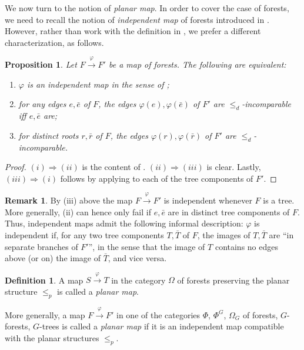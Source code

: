 \documentclass[a4paper,10pt
,draft
]{article}%
\numberwithin{equation}{section}
\numberwithin{figure}{section}
\newtheorem{proposition}[equation]{Proposition}%
\theoremstyle{definition} %
\newtheorem{definition}[equation]{Definition}%
\newtheorem{remark}[equation]{Remark}%
\newcommand{\1}{\ensuremath{\mathbbm 1}}%
\begin{document}
We now turn to the notion of \emph{planar map}.
In order to cover the case of forests, 
we need to recall
the notion of \emph{independent map} of forests
introduced in \cite[Def. 5.28]{Pe17}.
However, rather than work with the definition in 
\cite{Pe17}, we prefer a different characterization, as follows.

\begin{proposition}\label{INDMAPCHAR PROP}
	Let $F \xrightarrow{\varphi} F'$ be a map of forests.
	The following are equivalent:
\begin{enumerate}
	\item[(i)] $\varphi$ is an independent map in the sense of
	\cite[Def. 5.28]{Pe17};
	\item[(ii)] for any edges $e,\bar{e}$ of $F$,
	the edges
	$\varphi(e),\varphi(\bar{e})$ of $F'$
	are $\leq_d$-incomparable iff 
	$e,\bar{e}$ are;
	\item[(iii)] for distinct roots $r,\bar{r}$ of $F$,
	the edges
	$\varphi(r),\varphi(\bar{r})$ of $F'$
	are $\leq_d$-incomparable.
\end{enumerate}
\end{proposition}

\begin{proof}
	$(i) \Rightarrow (ii)$
	is the content of \cite[Lemma 5.32]{Pe17}.
	$(ii) \Rightarrow (iii)$ is clear.
	Lastly, 
	$(iii) \Rightarrow (i)$ follows by applying 
	\cite[Lemma 5.24]{Pe17} to each of the tree components of $F'$.
\end{proof}


\begin{remark}
	By (iii) above
	the map $F \xrightarrow{\varphi} F'$ is independent whenever $F$ is a tree. 
	More generally, (ii) can hence only fail
	if $e,\bar{e}$ are in distinct tree components of $F$.
	Thus, independent maps admit the following informal description:
	$\varphi$ is independent if, for any two tree components
	$T,\bar{T}$ of $F$,
	the images of $T,\bar{T}$ are ``in separate branches of $F'$'',
	in the sense that the image of $T$ contains no edges above (or on) the image of $\bar{T}$, and vice versa.
\end{remark}


\begin{definition}\label{PLANARMAP_DEF}
	A map $S \xrightarrow{\varphi} T$ in the category $\Omega$ of forests preserving the planar structure $\leq_p$
	is called a \textit{planar map}.
	
	More generally, a map $F \xrightarrow{\varphi} F'$ in one of the categories $\Phi$, $\Phi^G$, $\Omega_G$ of forests, $G$-forests, $G$-trees is called a \textit{planar map} if it is an independent map compatible with the planar structures $\leq_p$.
\end{definition}
\end{document}
